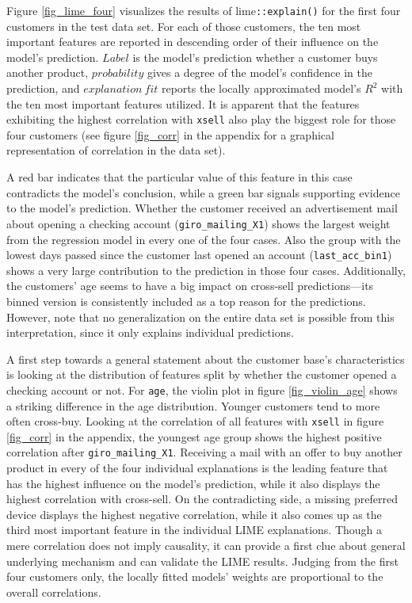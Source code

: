 \documentclass[12pt,a4paper]{article}
\newcommand{\pkg}[1]{{\normalfont\fontseries{b}\selectfont #1}}
\let\code=\texttt
\begin{document}
Figure \ref{fig_lime_four} visualizes the results of \pkg{lime}\code{::explain()} for the first four customers in the test data set.
For each of those customers, the ten most important features are reported in descending order of their influence on the model's prediction.
$Label$ is the model's prediction whether a customer buys another product, $probability$ gives a degree of the model's confidence in the prediction,
and $explanation\ fit$ reports the locally approximated model's $R^2$ with the ten most important features utilized.
It is apparent that the features exhibiting the highest correlation with \code{xsell} also play the biggest role for those four customers 
(see figure \ref{fig_corr} in the appendix for a graphical representation of correlation in the data set). 

A red bar indicates that the particular value of this feature in this case contradicts the model's conclusion,
while a green bar signals supporting evidence to the model's prediction.
Whether the customer received an advertisement mail about opening a checking account (\code{giro\_mailing\_X1}) shows the largest weight from the regression model in every one of the four cases.
Also the group with the lowest days passed since the customer last opened an account (\code{last\_acc\_bin1}) shows a very large contribution to the 
prediction in those four cases.
Additionally, the customers' age seems to have a big impact on cross-sell predictions---its binned version is consistently included as a top reason for the predictions.
However, note that no generalization on the entire data set is possible from this interpretation, since it only explains individual predictions.

A first step towards a general statement about the customer base's characteristics is looking at the distribution of features split by whether the customer
opened a checking account or not.
For \code{age}, the violin plot in figure \ref{fig_violin_age} shows a striking difference in the age distribution.
Younger customers tend to more often cross-buy.
Looking at the correlation of all features with \code{xsell} in figure \ref{fig_corr} in the appendix, the youngest age group shows the highest positive correlation after \code{giro\_mailing\_X1}.
Receiving a mail with an offer to buy another product in every of the four individual explanations is the leading feature that has the highest influence on
the model's prediction, while it also displays the highest correlation with cross-sell.
On the contradicting side, a missing preferred device displays the highest negative correlation,
while it also comes up as the third most important feature in the individual LIME explanations.
Though a mere correlation does not imply causality, it can provide a first clue about general underlying mechanism and can validate the LIME results.
Judging from the first four customers only, the locally fitted models' weights are proportional to the overall correlations.
\end{document}
